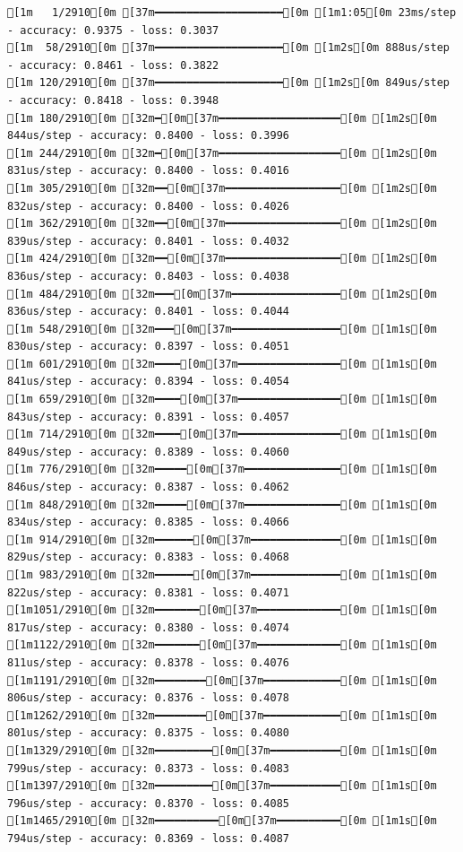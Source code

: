 \documentclass[
  letterpaper,
  DIV=11,
  numbers=noendperiod]{scrartcl}
\begin{document}
\begin{verbatim}
[1m   1/2910[0m [37m━━━━━━━━━━━━━━━━━━━━[0m [1m1:05[0m 23ms/step - accuracy: 0.9375 - loss: 0.3037
[1m  58/2910[0m [37m━━━━━━━━━━━━━━━━━━━━[0m [1m2s[0m 888us/step - accuracy: 0.8461 - loss: 0.3822 
[1m 120/2910[0m [37m━━━━━━━━━━━━━━━━━━━━[0m [1m2s[0m 849us/step - accuracy: 0.8418 - loss: 0.3948
[1m 180/2910[0m [32m━[0m[37m━━━━━━━━━━━━━━━━━━━[0m [1m2s[0m 844us/step - accuracy: 0.8400 - loss: 0.3996
[1m 244/2910[0m [32m━[0m[37m━━━━━━━━━━━━━━━━━━━[0m [1m2s[0m 831us/step - accuracy: 0.8400 - loss: 0.4016
[1m 305/2910[0m [32m━━[0m[37m━━━━━━━━━━━━━━━━━━[0m [1m2s[0m 832us/step - accuracy: 0.8400 - loss: 0.4026
[1m 362/2910[0m [32m━━[0m[37m━━━━━━━━━━━━━━━━━━[0m [1m2s[0m 839us/step - accuracy: 0.8401 - loss: 0.4032
[1m 424/2910[0m [32m━━[0m[37m━━━━━━━━━━━━━━━━━━[0m [1m2s[0m 836us/step - accuracy: 0.8403 - loss: 0.4038
[1m 484/2910[0m [32m━━━[0m[37m━━━━━━━━━━━━━━━━━[0m [1m2s[0m 836us/step - accuracy: 0.8401 - loss: 0.4044
[1m 548/2910[0m [32m━━━[0m[37m━━━━━━━━━━━━━━━━━[0m [1m1s[0m 830us/step - accuracy: 0.8397 - loss: 0.4051
[1m 601/2910[0m [32m━━━━[0m[37m━━━━━━━━━━━━━━━━[0m [1m1s[0m 841us/step - accuracy: 0.8394 - loss: 0.4054
[1m 659/2910[0m [32m━━━━[0m[37m━━━━━━━━━━━━━━━━[0m [1m1s[0m 843us/step - accuracy: 0.8391 - loss: 0.4057
[1m 714/2910[0m [32m━━━━[0m[37m━━━━━━━━━━━━━━━━[0m [1m1s[0m 849us/step - accuracy: 0.8389 - loss: 0.4060
[1m 776/2910[0m [32m━━━━━[0m[37m━━━━━━━━━━━━━━━[0m [1m1s[0m 846us/step - accuracy: 0.8387 - loss: 0.4062
[1m 848/2910[0m [32m━━━━━[0m[37m━━━━━━━━━━━━━━━[0m [1m1s[0m 834us/step - accuracy: 0.8385 - loss: 0.4066
[1m 914/2910[0m [32m━━━━━━[0m[37m━━━━━━━━━━━━━━[0m [1m1s[0m 829us/step - accuracy: 0.8383 - loss: 0.4068
[1m 983/2910[0m [32m━━━━━━[0m[37m━━━━━━━━━━━━━━[0m [1m1s[0m 822us/step - accuracy: 0.8381 - loss: 0.4071
[1m1051/2910[0m [32m━━━━━━━[0m[37m━━━━━━━━━━━━━[0m [1m1s[0m 817us/step - accuracy: 0.8380 - loss: 0.4074
[1m1122/2910[0m [32m━━━━━━━[0m[37m━━━━━━━━━━━━━[0m [1m1s[0m 811us/step - accuracy: 0.8378 - loss: 0.4076
[1m1191/2910[0m [32m━━━━━━━━[0m[37m━━━━━━━━━━━━[0m [1m1s[0m 806us/step - accuracy: 0.8376 - loss: 0.4078
[1m1262/2910[0m [32m━━━━━━━━[0m[37m━━━━━━━━━━━━[0m [1m1s[0m 801us/step - accuracy: 0.8375 - loss: 0.4080
[1m1329/2910[0m [32m━━━━━━━━━[0m[37m━━━━━━━━━━━[0m [1m1s[0m 799us/step - accuracy: 0.8373 - loss: 0.4083
[1m1397/2910[0m [32m━━━━━━━━━[0m[37m━━━━━━━━━━━[0m [1m1s[0m 796us/step - accuracy: 0.8370 - loss: 0.4085
[1m1465/2910[0m [32m━━━━━━━━━━[0m[37m━━━━━━━━━━[0m [1m1s[0m 794us/step - accuracy: 0.8369 - loss: 0.4087

\end{verbatim}
\end{document}
